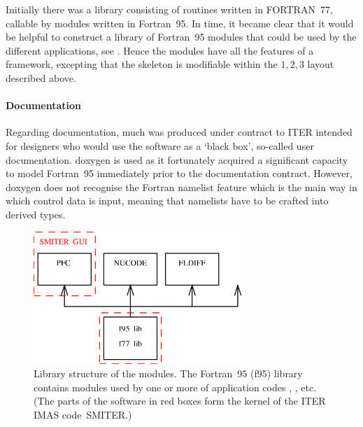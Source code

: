 Initially there was a library consisting of routines written in FORTRAN~77,
callable by modules written in Fortran~95. In time, it became clear that it would be
helpful to construct a library of Fortran~95 modules that could be used
by the different applications, see . Hence the  modules have all
the features of a framework, excepting that the skeleton is modifiable within
the $1, 2, 3$ layout described above.

\paragraph{Documentation}
Regarding documentation, much was produced under contract to ITER intended for designers
who would use the software as a `black box', so-called user documentation. doxygen
is used as it fortunately acquired a significant capacity to model Fortran~95 
immediately prior to the documentation contract. However, doxygen does not
recognise the Fortran namelist feature which is the main way in which
control data is input, meaning that namelists have to be crafted into derived types.

\begin{figure}
\centerline{\includegraphics[width=0.7\textwidth]{../pics/layout}}
\caption{Library structure of the  modules. The Fortran~95 (f95) library
contains modules used by one or more of application codes ,
, etc. (The parts of the software in red boxes form the kernel
of the ITER IMAS code~SMITER.)\label{fig:layout}}
\end{figure}

